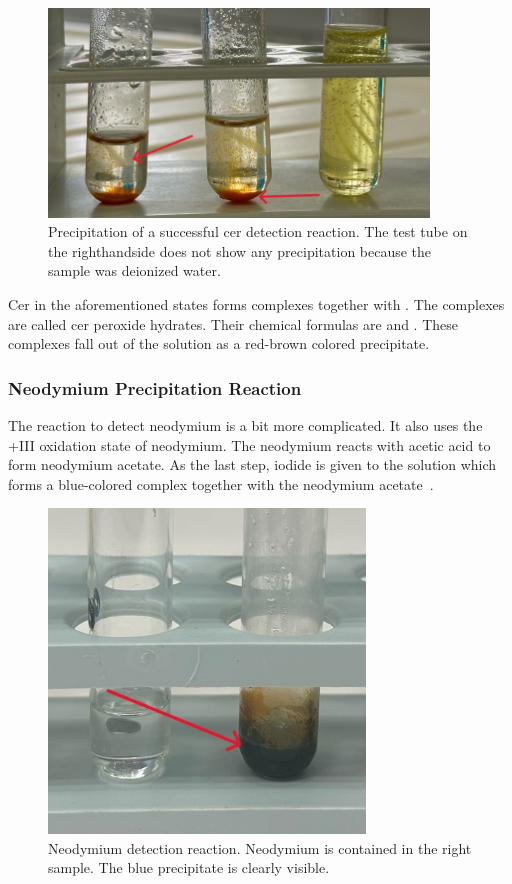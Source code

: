 \begin{figure}[H]
    \centering
    \includegraphics[width=0.9\textwidth]{./media/images/ree_precipitation_reaction_cropped}
    \caption{Precipitation of a successful cer detection reaction. The test tube on the righthandside does not show any precipitation because the sample was deionized water.}
    \label{fig:cer_precipitation_cropped1}
\end{figure}

Cer in the aforementioned states forms complexes together with .
The complexes are called cer peroxide hydrates.
Their chemical formulas are  and .
These complexes fall out of the solution as a red-brown colored precipitate.

\subsubsection{Neodymium Precipitation Reaction}
The reaction to detect neodymium is a bit more complicated.
It also uses the +III oxidation state of neodymium.
The neodymium reacts with acetic acid to form neodymium acetate.
As the last step, iodide is given to the solution which forms a blue-colored complex together with the neodymium acetate~\cite{janderblasius}.

\begin{figure}[H]
    \centering
    \includegraphics[width=0.75\textwidth]{./media/images/nd_precipitation_reaction_cropped}
    \caption{Neodymium detection reaction. Neodymium is contained in the right sample. The blue precipitate is clearly visible.}
    \label{fig:nd_precipitation}
\end{figure}

